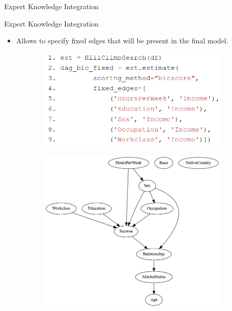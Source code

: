 \documentclass{beamer}
\begin{document}
\begin{frame}{Expert Knowledge Integration}
\begin{figure}
\begin{subfigure}{0.45 \textwidth}
		\end{subfigure}
	\end{figure}
\end{frame}

\begin{frame}{Expert Knowledge Integration}
	\begin{itemize}
		\item Allows to specify fixed edges that will be present in the final model.
	\end{itemize}

	\begin{figure}
		\begin{subfigure}{0.5 \textwidth}
			\centering
			\includegraphics[scale=0.28]{imgs/adult_fixed.png}
		\end{subfigure}%
		\begin{subfigure}{0.5 \textwidth}
			\centering
			\includegraphics[scale=0.3]{imgs/adult_bic_fixed.png}
		\end{subfigure}
	\end{figure}
\end{frame}
\end{document}
